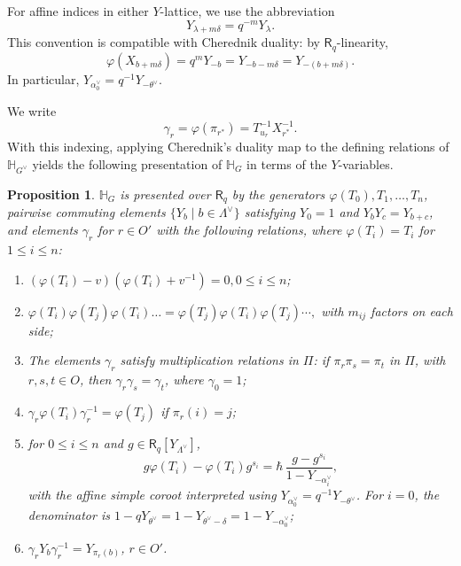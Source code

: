 \documentclass{amsart}
\newcommand{\Ring}{\mathsf{R}}
\newtheorem{Prop}[Thm]{Proposition}
\theoremstyle{definition}
\numberwithin{equation}{section}
\begin{document}
For affine indices in either \(Y\)-lattice, we use the abbreviation
\begin{equation}\label{eq:Y-affine-abbreviation}
Y_{\lambda+m\delta}=q^{-m}Y_\lambda.
\end{equation}
This convention is compatible with Cherednik duality: by
\(\Ring_q\)-linearity,
\[
\varphi(X_{b+m\delta})=q^mY_{-b}
=Y_{-b-m\delta}=Y_{-(b+m\delta)}.
\]
In particular,
\(Y_{\alpha_0^\vee}=q^{-1}Y_{-\theta^\vee}\).

We write
\begin{equation}\label{eq:gamma_defn}
\gamma_r=\varphi(\pi_{r^*})=T_{u_r}^{-1}X_{r^*}^{-1}.
\end{equation}
With this indexing, applying Cherednik's duality map to the defining relations of $\mathbb{H}_{G^\vee}$
yields the following presentation of $\mathbb{H}_{G}$ in terms of the \(Y\)-variables.

\begin{Prop}\label{prop:tygamma}
    $\mathbb{H}_{G}$ is presented over $\Ring_q$ by the generators
    \(\varphi(T_0),T_1,\ldots,T_n\), pairwise commuting elements
    $\{Y_b \mid b \in \Lambda^\vee\}$ satisfying
    \(Y_0=1\) and \(Y_bY_c=Y_{b+c}\),
    and elements $\gamma_r$ for $r \in O'$ with the following relations,
    where \(\varphi(T_i)=T_i\) for \(1\leqslant i\leqslant n\):
    \begin{enumerate}
        \item\label{rel:tygamma-quadratic} $(\varphi(T_i) - v)(\varphi(T_i) + v^{-1}) = 0, 0 \leqslant i \leqslant n$;
        \item\label{rel:tygamma-braid} $\varphi(T_i)\varphi(T_j)\varphi(T_i) \dots = \varphi(T_j)\varphi(T_i)\varphi(T_j) \cdots,$ with $m_{ij}$ factors on each side;
        \item\label{rel:tygamma-gamma-product} The elements \(\gamma_r\) satisfy multiplication relations in \(\Pi\): if \(\pi_r\pi_s=\pi_t\) in \(\Pi\), with \(r,s,t\in O\), then \(\gamma_r\gamma_s=\gamma_t\), where \(\gamma_0 = 1\);
        \item\label{rel:tygamma-diagram} $\gamma_r \varphi(T_i) \gamma_r^{-1} = \varphi(T_j)$ if $\pi_r(i)=j$;
        \item\label{rel:tygamma-bernstein} for \(0\leqslant i\leqslant n\) and \(g\in \Ring_q[Y_{\Lambda^\vee}]\),
        \[
        g\varphi(T_i)-\varphi(T_i) g^{s_i}
        =
        \hbar\,\frac{g-g^{s_i}}{1-Y_{-\alpha_i^\vee}},
        \]
        with the affine simple coroot interpreted using
        \(Y_{\alpha_0^\vee}=q^{-1}Y_{-\theta^\vee}\). For \(i=0\), the
        denominator is
        \(1-qY_{\theta^\vee}=1-Y_{\theta^\vee-\delta}=1-Y_{-\alpha_0^\vee}\);
        \item\label{rel:tygamma-y-conjugation} $\gamma_r Y_b \gamma_r^{-1} = Y_{\pi_r(b)}$, $r \in O'$.
    \end{enumerate}
\end{Prop}
\end{document}
